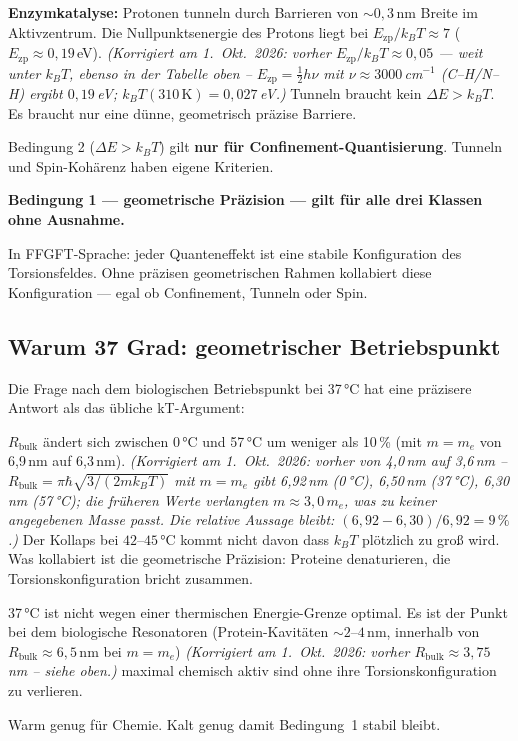 \textbf{Enzymkatalyse:}
Protonen tunneln durch Barrieren von $\sim 0{,}3$\,nm Breite
im Aktivzentrum. Die Nullpunktsenergie des Protons liegt bei
$E_\text{zp}/k_BT \approx 7$ ($E_\text{zp} \approx 0{,}19$\,eV). \textit{(Korrigiert am 1.~Okt.~2026: vorher \glqq $E_\text{zp}/k_BT \approx 0{,}05$ --- weit unter $k_BT$\grqq{}, ebenso in der Tabelle oben -- $E_\text{zp} = \tfrac12 h\nu$ mit $\nu \approx 3000$\,cm$^{-1}$ (C--H/N--H) ergibt $0{,}19$\,eV; $k_BT(310\,\text{K}) = 0{,}027$\,eV.)}
Tunneln braucht kein $\Delta E > k_BT$. Es braucht nur
eine dünne, geometrisch präzise Barriere.

\begin{foundation}
Bedingung 2 ($\Delta E > k_BT$) gilt \textbf{nur für Confinement-Quantisierung}.
Tunneln und Spin-Kohärenz haben eigene Kriterien.

\textbf{Bedingung 1 --- geometrische Präzision --- gilt für alle drei Klassen
ohne Ausnahme.}

In FFGFT-Sprache: jeder Quanteneffekt ist eine stabile Konfiguration
des Torsionsfeldes. Ohne präzisen geometrischen Rahmen kollabiert
diese Konfiguration --- egal ob Confinement, Tunneln oder Spin.
\end{foundation}

\subsection{Warum 37 Grad: geometrischer Betriebspunkt}

Die Frage nach dem biologischen Betriebspunkt bei 37\,°C
hat eine präzisere Antwort als das übliche kT-Argument:

$R_{\text{bulk}}$ ändert sich zwischen 0\,°C und 57\,°C
um weniger als 10\,\% (mit $m = m_e$ von 6{,}9\,nm auf 6{,}3\,nm). \textit{(Korrigiert am 1.~Okt.~2026: vorher \glqq von 4{,}0\,nm auf 3{,}6\,nm\grqq{} -- $R_{\text{bulk}} = \pi\hbar\sqrt{3/(2mk_BT)}$ mit $m = m_e$ gibt 6{,}92\,nm (0\,°C), 6{,}50\,nm (37\,°C), 6{,}30\,nm (57\,°C); die früheren Werte verlangten $m \approx 3{,}0\,m_e$, was zu keiner angegebenen Masse passt. Die relative Aussage bleibt: $(6{,}92 - 6{,}30)/6{,}92 = 9\,\%$.)}
Der Kollaps bei $42$--$45\,°\text{C}$ kommt nicht davon
dass $k_BT$ plötzlich zu groß wird. Was kollabiert ist
die geometrische Präzision: Proteine denaturieren,
die Torsionskonfiguration bricht zusammen.

\begin{foundation}
37\,°C ist nicht wegen einer thermischen Energie-Grenze optimal.
Es ist der Punkt bei dem biologische Resonatoren
(Protein-Kavitäten $\sim 2$--$4$\,nm, innerhalb von
$R_{\text{bulk}} \approx 6{,}5$\,nm bei $m = m_e$) \textit{(Korrigiert am 1.~Okt.~2026: vorher $R_{\text{bulk}} \approx 3{,}75$\,nm -- siehe oben.)} maximal
chemisch aktiv sind ohne ihre Torsionskonfiguration zu verlieren.

Warm genug für Chemie.
Kalt genug damit Bedingung~1 stabil bleibt.
\end{foundation}

